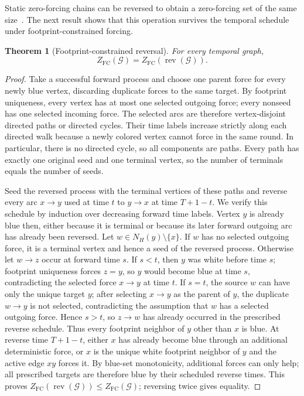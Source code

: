 \documentclass[11pt]{article}
\newtheorem{theorem}{Theorem}[section]
\theoremstyle{definition}
\theoremstyle{remark}
\newcommand{\calG}{\mathcal{G}}
\newcommand{\FC}{\mathrm{FC}}
\newcommand{\rev}{\operatorname{rev}}
\begin{document}
Static zero-forcing chains can be reversed to obtain a zero-forcing set of
the same size~\cite{barioli2010}.  The next result shows that this operation
survives the temporal schedule under footprint-constrained forcing.

\begin{theorem}[Footprint-constrained reversal]\label{thm:reversal}
For every temporal graph,
\[
 Z_{\FC}(\calG)=Z_{\FC}(\rev(\calG)).
\]
\end{theorem}

\begin{proof}
Take a successful forward process and choose one parent force for every newly
blue vertex, discarding duplicate forces to the same target.  By footprint
uniqueness, every vertex has at most one selected outgoing force; every
nonseed has one selected incoming force.  The selected arcs are therefore
vertex-disjoint directed paths or directed cycles.  Their time labels increase strictly along
each directed walk because a newly colored vertex cannot force in the same
round.  In particular, there is no directed cycle, so all components are
paths.  Every path has exactly
one original seed and one terminal vertex, so the number of terminals equals
the number of seeds.

Seed the reversed process with the terminal vertices of these paths and
reverse every arc $x\to y$ used at time $t$ to $y\to x$ at time
$T+1-t$.  We verify this schedule by induction over decreasing forward time
labels.  Vertex $y$ is already blue then, either because it is terminal or
because its later forward outgoing arc has already been reversed.  Let
$w\in N_H(y)\setminus\{x\}$.  If $w$ has no selected outgoing force, it is a
terminal vertex and hence a seed of the reversed process.  Otherwise let
$w\to z$ occur at forward time $s$.  If $s<t$, then $y$ was white before
time $s$; footprint uniqueness forces $z=y$, so $y$ would become blue at
time $s$, contradicting the selected force $x\to y$ at time $t$.  If $s=t$,
the source $w$ can have only the unique target $y$; after selecting $x\to y$
as the parent of $y$, the duplicate $w\to y$ is not selected, contradicting
the assumption that $w$ has a selected outgoing force.  Hence $s>t$, so
$z\to w$ has already
occurred in the prescribed reverse schedule.  Thus every footprint neighbor
of $y$ other than $x$ is blue.  At reverse time $T+1-t$, either $x$ has
already become blue through an additional deterministic force, or $x$ is the
unique white footprint neighbor of $y$ and the active edge $xy$ forces it.
By blue-set monotonicity, additional forces can only help; all prescribed
targets are therefore blue by their scheduled reverse times.  This proves
$Z_{\FC}(\rev(\calG))\le Z_{\FC}(\calG)$; reversing twice gives equality.
\end{proof}
\end{document}
